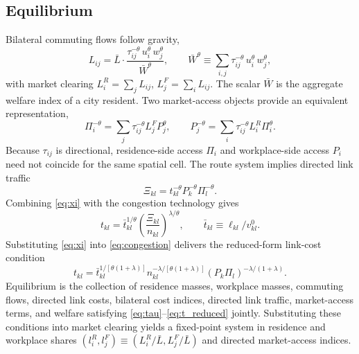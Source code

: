 \documentclass[12pt]{article}
\begin{document}
\subsection{Equilibrium}
\label{ssec:equilibrium}

Bilateral commuting flows follow gravity,
\begin{equation}
  L_{ij} = \bar{L} \cdot \frac{\tau_{ij}^{-\theta}\, u_i^{\theta}\, w_j^{\theta}}{\bar{W}^{\theta}}, \qquad \bar{W}^{\theta} \equiv \sum_{i,j} \tau_{ij}^{-\theta}\, u_i^{\theta}\, w_j^{\theta},
  \label{eq:gravity}
\end{equation}
with market clearing $L_i^R = \sum_j L_{ij}$, $L_j^F = \sum_i L_{ij}$. The scalar $\bar{W}$ is the aggregate welfare index of a city resident. Two market-access objects provide an equivalent representation,
\begin{equation}
  \Pi_i^{-\theta} = \sum_j \tau_{ij}^{-\theta} L_j^F P_j^{\theta}, \qquad
  P_j^{-\theta} = \sum_i \tau_{ij}^{-\theta} L_i^R \Pi_i^{\theta}.
  \label{eq:ma}
\end{equation}
Because $\tau_{ij}$ is directional, residence-side access $\Pi_i$ and workplace-side access $P_i$ need not coincide for the same spatial cell. The route system implies directed link traffic
\begin{equation}
  \Xi_{kl} = t_{kl}^{-\theta} P_k^{-\theta} \Pi_l^{-\theta}.
  \label{eq:xi}
\end{equation}
Combining \eqref{eq:xi} with the congestion technology gives
\begin{equation}
  t_{kl} =
  \bar{t}_{kl}^{1/\theta}
  \left(\frac{\Xi_{kl}}{n_{kl}}\right)^{\lambda/\theta},
  \qquad
  \bar{t}_{kl} \equiv \ell_{kl}/v^0_{kl}.
  \label{eq:congestion}
\end{equation}
Substituting \eqref{eq:xi} into \eqref{eq:congestion} delivers the reduced-form link-cost condition
\begin{equation}
  t_{kl}
  =
  \bar{t}_{kl}^{1/[\theta(1+\lambda)]}
  n_{kl}^{-\lambda/[\theta(1+\lambda)]}
  (P_k\Pi_l)^{-\lambda/(1+\lambda)}.
  \label{eq:t_reduced}
\end{equation}
Equilibrium is the collection of residence masses, workplace masses, commuting flows, directed link costs, bilateral cost indices, directed link traffic, market-access terms, and welfare satisfying \eqref{eq:tau}--\eqref{eq:t_reduced} jointly. Substituting these conditions into market clearing yields a fixed-point system in residence and workplace shares $(l_i^R, l_j^F) \equiv (L_i^R/\bar{L}, L_j^F/\bar{L})$ and directed market-access indices.
\end{document}
